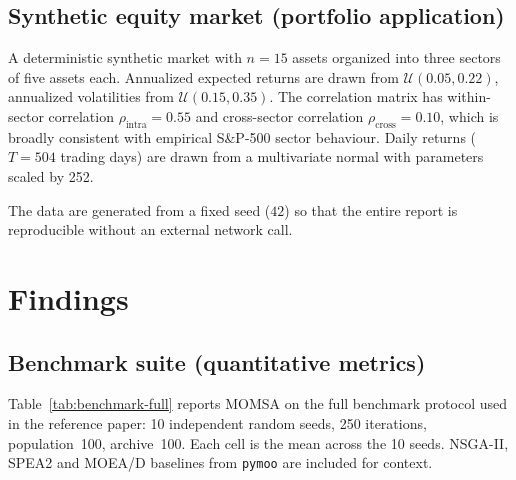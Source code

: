 \documentclass[11pt,a4paper]{article}
\begin{document}
\subsection{Synthetic equity market (portfolio application)}

A deterministic synthetic market with $n=15$ assets organized into three
sectors of five assets each. Annualized expected returns are drawn from
$\mathcal{U}(0.05, 0.22)$, annualized volatilities from
$\mathcal{U}(0.15, 0.35)$. The correlation matrix has within-sector
correlation $\rho_{\text{intra}}=0.55$ and cross-sector correlation
$\rho_{\text{cross}}=0.10$, which is broadly consistent with empirical
S\&P-500 sector behaviour. Daily returns ($T=504$ trading days) are
drawn from a multivariate normal with parameters scaled by 252.

The data are generated from a fixed seed ($42$) so that the entire
report is reproducible without an external network call.

\section{Findings}
\label{sec:findings}

\subsection{Benchmark suite (quantitative metrics)}
\label{sec:findings-bench}

Table~\ref{tab:benchmark-full} reports MOMSA on the full benchmark
protocol used in the reference paper: 10 independent random seeds, 250
iterations, population~100, archive~100. Each cell is the mean across
the 10 seeds. NSGA-II, SPEA2 and MOEA/D baselines from \texttt{pymoo}
are included for context.
\end{document}
